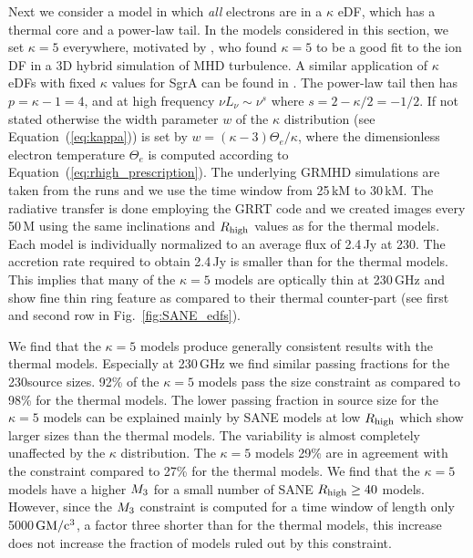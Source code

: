Next we consider a model in which {\em all} electrons are in a $\kappa$ eDF, which has a thermal core and a power-law tail.  In the models considered in this section, we set $\kappa = 5$ everywhere,  motivated by \cite{2016PhRvL.117w5101K}, who found $\kappa = 5$ to be a good fit to the ion DF in a 3D hybrid simulation of MHD turbulence. A similar application of $\kappa$ eDFs with fixed $\kappa$ values for SgrA can be found in \citet{davelaar2018}.  The power-law tail then has $p = \kappa - 1 = 4$, and at high frequency $\nu L_\nu \sim \nu^s$ where $s = 2 - \kappa/2 = -1/2$.
{If not stated otherwise the width parameter $w$ of the $\kappa$ distribution (see Equation~(\ref{eq:kappa})) is set by $w = (\kappa - 3) \Theta_e/\kappa$, where the dimensionless electron temperature $\Theta_e$ is computed according to Equation~(\ref{eq:rhigh_prescription}). The underlying GRMHD simulations are taken from the \bhac runs and we use the time window from 25\,kM to 30\,kM. The radiative transfer is done employing the GRRT code \bhoss \citep{Younsi2012,Younsi2020} and we created images every 50\,M using the same inclinations and $R_\mathrm{high}$ values as for the thermal models. Each model is individually normalized to an average flux of 2.4\,Jy at 230\GHz.} The accretion rate required to obtain 2.4\,Jy is smaller than for the thermal models. This implies that many of the $\kappa=5$ models are optically thin at 230\,GHz and show fine thin ring feature as compared to their thermal counter-part (see first and second row in Fig.~\ref{fig:SANE_edfs}).

We find that the $\kappa=5$ models produce generally consistent results with the \bhac thermal models. Especially at 230\,GHz we find similar passing fractions for the 230\GHz source sizes. 92\% of the $\kappa=5$ models pass the size constraint as compared to 98\% for the thermal models. The lower passing fraction in source size for the $\kappa=5$ models can be explained mainly by SANE models at low $R_\mathrm{high}$ which show larger sizes than the thermal models.
The variability is almost completely unaffected by the $\kappa$ distribution. The $\kappa=5$ models 29\% are in agreement with the constraint compared to 27\% for the thermal models.  We find that the $\kappa=5$ models have a higher $M_{3}$ for a small number of SANE $R_{\rm high}\geq 40$ models. However, since the $M_{3}$ constraint is computed for a time window of length only 5000\,$\rm{GM/c^3}$, a factor three shorter than for the thermal models, this increase does not increase the fraction of models ruled out by this constraint.

